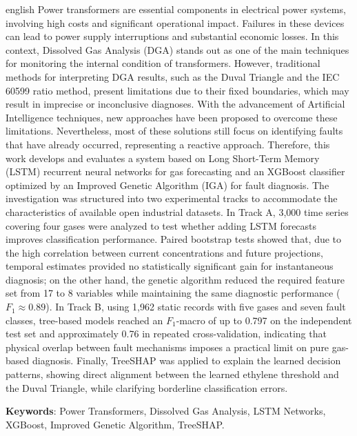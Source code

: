 \begin{resumo}[Abstract]
 \begin{otherlanguage*}{english}
Power transformers are essential components in electrical power systems, involving high costs and significant operational impact. Failures in these devices can lead to power supply interruptions and substantial economic losses. In this context, Dissolved Gas Analysis (DGA) stands out as one of the main techniques for monitoring the internal condition of transformers. However, traditional methods for interpreting DGA results, such as the Duval Triangle and the IEC 60599 ratio method, present limitations due to their fixed boundaries, which may result in imprecise or inconclusive diagnoses. With the advancement of Artificial Intelligence techniques, new approaches have been proposed to overcome these limitations. Nevertheless, most of these solutions still focus on identifying faults that have already occurred, representing a reactive approach. Therefore, this work develops and evaluates a system based on Long Short-Term Memory (LSTM) recurrent neural networks for gas forecasting and an XGBoost classifier optimized by an Improved Genetic Algorithm (IGA) for fault diagnosis. The investigation was structured into two experimental tracks to accommodate the characteristics of available open industrial datasets. In Track A, 3,000 time series covering four gases were analyzed to test whether adding LSTM forecasts improves classification performance. Paired bootstrap tests showed that, due to the high correlation between current concentrations and future projections, temporal estimates provided no statistically significant gain for instantaneous diagnosis; on the other hand, the genetic algorithm reduced the required feature set from 17 to 8 variables while maintaining the same diagnostic performance ($F_1 \approx 0.89$). In Track B, using 1,962 static records with five gases and seven fault classes, tree-based models reached an $F_1$-macro of up to 0.797 on the independent test set and approximately 0.76 in repeated cross-validation, indicating that physical overlap between fault mechanisms imposes a practical limit on pure gas-based diagnosis. Finally, TreeSHAP was applied to explain the learned decision patterns, showing direct alignment between the learned ethylene threshold and the Duval Triangle, while clarifying borderline classification errors.

   \vspace{\onelineskip}
 
   \noindent 
   \textbf{Keywords}: Power Transformers, Dissolved Gas Analysis, LSTM Networks, XGBoost, Improved Genetic Algorithm, TreeSHAP.
 \end{otherlanguage*}
\end{resumo}



